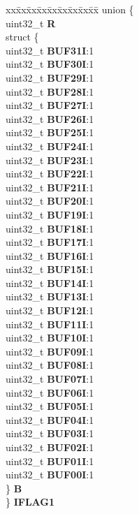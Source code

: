 \begin{DoxyCompactItemize}
\begin{tabbing}
\end{tabbing}\item 
\mbox{\label{structFLEXCAN__tag_a04293cbed1eac9c9f1f5d2f1d06910cb}} 
\begin{tabbing}
xx\=xx\=xx\=xx\=xx\=xx\=xx\=xx\=xx\=\kill
union \{\\
\>uint32\_t {\bfseries R}\\
\>struct \{\\
\>\>uint32\_t {\bfseries BUF31I}:1\\
\>\>uint32\_t {\bfseries BUF30I}:1\\
\>\>uint32\_t {\bfseries BUF29I}:1\\
\>\>uint32\_t {\bfseries BUF28I}:1\\
\>\>uint32\_t {\bfseries BUF27I}:1\\
\>\>uint32\_t {\bfseries BUF26I}:1\\
\>\>uint32\_t {\bfseries BUF25I}:1\\
\>\>uint32\_t {\bfseries BUF24I}:1\\
\>\>uint32\_t {\bfseries BUF23I}:1\\
\>\>uint32\_t {\bfseries BUF22I}:1\\
\>\>uint32\_t {\bfseries BUF21I}:1\\
\>\>uint32\_t {\bfseries BUF20I}:1\\
\>\>uint32\_t {\bfseries BUF19I}:1\\
\>\>uint32\_t {\bfseries BUF18I}:1\\
\>\>uint32\_t {\bfseries BUF17I}:1\\
\>\>uint32\_t {\bfseries BUF16I}:1\\
\>\>uint32\_t {\bfseries BUF15I}:1\\
\>\>uint32\_t {\bfseries BUF14I}:1\\
\>\>uint32\_t {\bfseries BUF13I}:1\\
\>\>uint32\_t {\bfseries BUF12I}:1\\
\>\>uint32\_t {\bfseries BUF11I}:1\\
\>\>uint32\_t {\bfseries BUF10I}:1\\
\>\>uint32\_t {\bfseries BUF09I}:1\\
\>\>uint32\_t {\bfseries BUF08I}:1\\
\>\>uint32\_t {\bfseries BUF07I}:1\\
\>\>uint32\_t {\bfseries BUF06I}:1\\
\>\>uint32\_t {\bfseries BUF05I}:1\\
\>\>uint32\_t {\bfseries BUF04I}:1\\
\>\>uint32\_t {\bfseries BUF03I}:1\\
\>\>uint32\_t {\bfseries BUF02I}:1\\
\>\>uint32\_t {\bfseries BUF01I}:1\\
\>\>uint32\_t {\bfseries BUF00I}:1\\
\>\} {\bfseries B}\\
\} {\bfseries IFLAG1}\\


\end{tabbing}
\end{DoxyCompactItemize}
